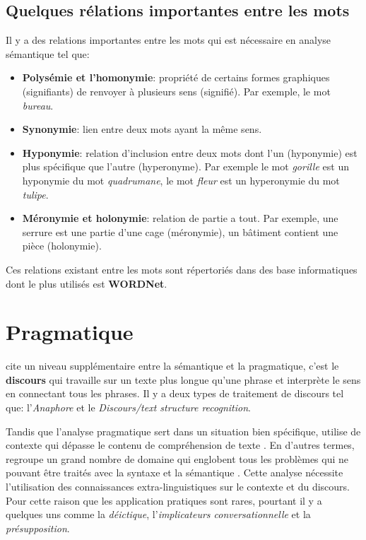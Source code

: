 \subsection*{Quelques rélations importantes entre les mots}
Il y a des relations importantes entre les mots \citep{automatic-nlp} qui est nécessaire en analyse sémantique tel que:
\begin{itemize}
    \item \textbf{Polysémie et l'homonymie}: propriété de certains formes graphiques (signifiants) de renvoyer à plusieurs sens (signifié). Par exemple, le mot \textit{bureau}.
    \item \textbf{Synonymie}: lien entre deux mots ayant la même sens.
    \item \textbf{Hyponymie}: relation d'inclusion entre deux mots dont l'un (hyponymie) est plus spécifique que l'autre (hyperonyme). Par exemple le mot \textit{gorille} est un hyponymie du mot \textit{quadrumane}, le mot \textit{fleur} est un hyperonymie du mot \textit{tulipe}.
    \item \textbf{Méronymie et holonymie}: relation de partie a tout. Par exemple, une serrure est une partie d'une cage (méronymie), un bâtiment contient une pièce (holonymie).
\end{itemize}

Ces relations existant entre les mots sont répertoriés dans des base informatiques dont le plus utilisés est \textbf{WORDNet}.

\section{Pragmatique}
\citeauthor{natural-language-processing} cite un niveau supplémentaire entre la sémantique et la pragmatique, c'est le \textbf{discours} qui travaille sur un texte plus longue qu'une phrase et interprète le sens en connectant tous les phrases. Il y a deux types de traitement de discours tel que: l'\textit{Anaphore} et le \textit{Discours/text structure recognition}.

Tandis que l'analyse pragmatique sert dans un situation bien spécifique, utilise de contexte qui dépasse le contenu de compréhension de texte \citep{natural-language-processing}. En d'autres termes, regroupe un grand nombre de domaine qui englobent tous les problèmes qui ne pouvant être traités avec la syntaxe et la sémantique \citep{automatic-nlp}. Cette analyse nécessite l'utilisation des connaissances extra-linguistiques sur le contexte et du discours. Pour cette raison que les application pratiques sont rares, pourtant il y a quelques uns \citep{automatic-nlp} comme la \textit{déictique}, l'\textit{implicateurs conversationnelle} et la \textit{présupposition}.

